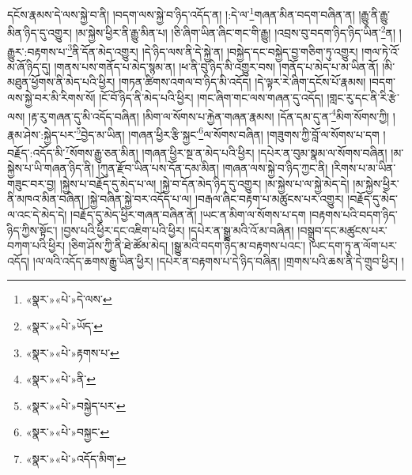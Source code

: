 དངོས་རྣམས་དེ་ལས་སྐྱེ་བ་ནི། །བདག་ལས་སྐྱེ་བ་ཉིད་འདོད་ན། །:དེ་ལ་\footnote{«སྣར་»«པེ་»དེ་ལས་}གཞན་མིན་བདག་བཞིན་ན། །རྒྱུ་ནི་རྒྱུ་མིན་ཉིད་དུ་འགྱུར། །མ་སྐྱེས་ཕྱིར་ནི་རྒྱུ་མིན་པ། །ཅི་ཞིག་ཡིན་ཞིང་གང་གི་རྒྱུ། །འབྲས་བུ་བདག་ཉིད་ཉིད་ཡིན་\footnote{«སྣར་»«པེ་»ཡོད་}ན། །རྒྱུར་:བརྟགས་པ་\footnote{«སྣར་»«པེ་»རྟགས་པ་}ནི་དོན་མེད་འགྱུར། །དེ་ཉིད་ལས་ནི་དེ་སྐྱེ་ན། །བསྐྱེད་དང་བསྐྱེད་བྱ་གཅིག་ཏུ་འགྱུར། །གལ་ཏེ་འོ་མ་ཞོ་ཉིད་དུ། །གནས་པས་གནོད་པ་མེད་སྙམ་ན། །ཕ་ནི་བུ་ཉིད་མི་འགྱུར་བས། །གནོད་པ་མེད་པ་མ་ཡིན་ནོ། །མི་མཐུན་ཕྱོགས་ནི་མེད་པའི་ཕྱིར། །གཏན་ཚིགས་འགལ་བ་ཉིད་མི་འདོད། །དེ་ལྟར་རེ་ཞིག་དངོས་པོ་རྣམས། །བདག་ལས་སྐྱེ་བར་མི་རིགས་སོ། །ངོ་བོ་ཉིད་ནི་མེད་པའི་ཕྱིར། །གང་ཞིག་གང་ལས་གཞན་དུ་འདོད། །གླང་རུ་དང་ནི་རི་རྩེ་ལས། །རྟ་རུ་གཞན་དུ་མི་འདོད་བཞིན། །མིག་ལ་སོགས་པ་རྐྱེན་གཞན་རྣམས། །དོན་དམ་དུ་ན་\footnote{«སྣར་»«པེ་»ནི་}མིག་སོགས་ཀྱི། །རྣམ་ཤེས་:སྐྱེད་པར་\footnote{«སྣར་»«པེ་»བསྐྱེད་པར་}བྱེད་མ་ཡིན། །གཞན་ཕྱིར་རྩི་སྐྱང་\footnote{«སྣར་»«པེ་»བསྐྱང་}ལ་སོགས་བཞིན། །གཟུགས་ཀྱི་བློ་ལ་སོགས་པ་དག །བརྗོད་:འདོད་མི་\footnote{«སྣར་»«པེ་»འདོད་མིག་}སོགས་རྒྱུ་ཅན་མིན། །གཞན་ཕྱིར་སྔ་ན་མེད་པའི་ཕྱིར། །དཔེར་ན་བུམ་སྣམ་ལ་སོགས་བཞིན། །མ་སྐྱེས་པ་ཡི་གཞན་ཉིད་ནི། །ཀུན་རྫོབ་ཡིན་པས་དོན་དམ་མིན། །གཞན་ལས་སྐྱེ་བ་ཉིད་ཀྱང་ནི། །རིགས་པ་མ་ཡིན་གཟུང་བར་བྱ། །སྐྱེས་པ་བརྗོད་དུ་མེད་པ་ལ། །སྐྱེ་བ་དོན་མེད་ཉིད་དུ་འགྱུར། །མ་སྐྱེས་པ་ལ་སྐྱེ་མེད་དེ། །མ་སྐྱེས་ཕྱིར་ནི་མཁའ་མིན་བཞིན། །སྐྱེ་བཞིན་སྐྱེ་བར་འདོད་པ་ལ། །བརྒལ་ཞིང་བརྟག་པ་མཚུངས་པར་འགྱུར། །བརྗོད་དུ་མེད་ལ་འང་དེ་མེད་དེ། །བརྗོད་དུ་མེད་ཕྱིར་གཞན་བཞིན་ནོ། །ཡང་ན་མིག་ལ་སོགས་པ་དག །བརྟགས་པའི་བདག་ཉིད་ཉིད་ཀྱིས་སྟོང་། །བྱས་པའི་ཕྱིར་དང་འཇིག་པའི་ཕྱིར། །དཔེར་ན་སྒྱུ་མའི་འོ་མ་བཞིན། །བསྒྲུབ་དང་མཚུངས་པར་བཀག་པའི་ཕྱིར། །ཅིག་ཤོས་ཀྱི་ནི་ཐེ་ཚོམ་མེད། །སྒྱུ་མའི་བདག་ཉིད་མ་བརྟགས་པའང་། །ཡང་དག་ཏུ་ན་ལོག་པར་འདོད། །ལ་ལའི་འདོད་ཆགས་རྒྱུ་ཡིན་ཕྱིར། །དཔེར་ན་བརྟགས་པ་དེ་ཉིད་བཞིན། །གྲགས་པའི་ཆས་ནི་དེ་གྲུབ་ཕྱིར། །
